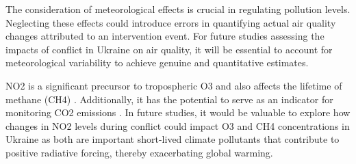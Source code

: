 The consideration of meteorological effects is crucial in regulating pollution levels. Neglecting these effects could introduce errors in quantifying actual air quality changes attributed to an intervention event. For future studies assessing the impacts of conflict in Ukraine on air quality, it will be essential to account for meteorological variability to achieve genuine and quantitative estimates.\par

NO2 is a significant precursor to tropospheric O3 and also affects the lifetime of methane (CH4) \citep{akimoto2022rethinking}. Additionally, it has the potential to serve as an indicator for monitoring CO2 emissions \citep{miyazaki2023predictability}. In future studies, it would be valuable to explore how changes in NO2 levels during conflict could impact O3 and CH4 concentrations in Ukraine as both are important short-lived climate pollutants that contribute to positive radiative forcing, thereby exacerbating global warming.\par

